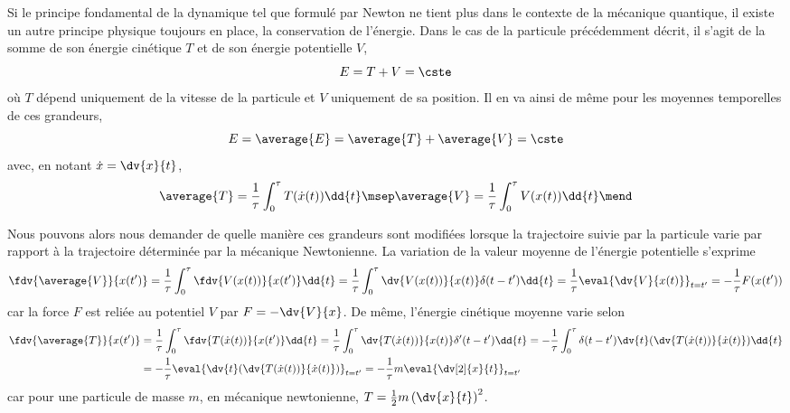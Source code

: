 \par Si le principe fondamental de la dynamique tel que formulé par Newton ne tient plus dans le contexte de la mécanique quantique, il existe un autre principe physique toujours en place, la conservation de l'énergie. Dans le cas de la particule précédemment décrit, il s'agit de la somme de son énergie cinétique $T$ et de son énergie potentielle $V$, \ie
\begin{equation}
E = T + V = \cste
\end{equation}
où $T$ dépend uniquement de la vitesse de la particule et $V$ uniquement de sa position. %
Il en va ainsi de même pour les moyennes temporelles de ces grandeurs,
\begin{equation}
E = \average{E} = \average{T} + \average{V} = \cste
\end{equation}
avec, en notant $\dot{x}=\dv{x}{t}$,
\begin{equation}
\average{T} = \frac{1}{\tau}\int_0^\tau T(\dot{x}(t)) \dd{t}
\msep
\average{V} = \frac{1}{\tau}\int_0^\tau V(x(t)) \dd{t}
\mend
\end{equation}
\par
Nous pouvons alors nous demander de quelle manière ces grandeurs sont modifiées lorsque la trajectoire suivie par la particule varie par rapport à la trajectoire déterminée par la mécanique Newtonienne. La variation de la valeur moyenne de l'énergie potentielle s'exprime
\begin{equation}
\fdv{\average{V}}{x(t')}
= \frac{1}{\tau}\int_0^\tau \fdv{V(x(t))}{x(t')} \dd{t}
= \frac{1}{\tau}\int_0^\tau \dv{V(x(t))}{x(t)}\delta(t-t') \dd{t}
= \frac{1}{\tau}\eval{\dv{V}{x(t)}}_{t=t'}
= -\frac{1}{\tau}F(x(t'))
\end{equation}
car la force $F$ est reliée au potentiel $V$ par $F = - \dv{V}{x}$.
De même, l'énergie cinétique moyenne varie selon
\begin{align}
\fdv{\average{T}}{x(t')}
&
= \frac{1}{\tau}\int_0^\tau \fdv{T(\dot{x}(t))}{x(t')} \dd{t}
=\frac{1}{\tau}\int_0^\tau \dv{T(\dot{x}(t))}{x(t)}\delta'(t-t') \dd{t}
=-\frac{1}{\tau}\int_0^\tau \delta(t-t') \dv{t}(\dv{T(\dot{x}(t))}{\dot{x}(t)}) \dd{t}
\nonumber
\\&
=-\frac{1}{\tau}\eval{\dv{t}(\dv{T(\dot{x}(t))}{\dot{x}(t)})}_{t=t'}
=-\frac{1}{\tau}m\eval{\dv[2]{x}{t}}_{t=t'}
\end{align}
car pour une particule de masse $m$, en mécanique newtonienne, $T = \frac{1}{2}m\left(\dv{x}{t}\right)^2$.
\par
